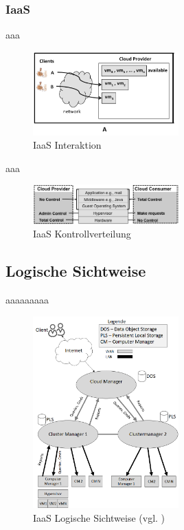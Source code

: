 \subsubsection{IaaS}
aaa
\begin{figure}[H]
    \centering
	\includegraphics[width=0.5\textwidth]{Images/IaaSInteraction}
	\caption{IaaS Interaktion \cite{Badger}}
	\label{IaaSInteraction}
\end{figure}

aaa
\begin{figure}[H]
    \centering
	\includegraphics[width=0.5\textwidth]{Images/IaaSControl}
	\caption{IaaS Kontrollverteilung \cite{Badger}}
	\label{IaaSControl}
\end{figure}

\subsection{Logische Sichtweise}
aaaaaaaaa
\begin{figure}[H]
    \centering
	\includegraphics[width=0.5\textwidth]{Images/IaaSLogic}
	\caption{IaaS Logische Sichtweise (vgl. \cite{Badger})}
	\label{IaaSLogic}
\end{figure}

